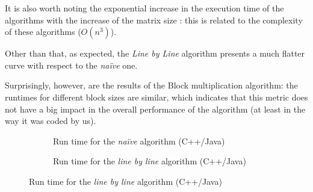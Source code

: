 \documentclass[11pt,a4paper]{article}
\begin{document}
It is also worth noting  the exponential increase in the execution time of the algorithms with the increase of the matrix size : this is related to the complexity of these algorithms ($O(n^3)$).

Other than that, as expected, the \emph{Line by Line} algorithm presents a much flatter curve with respect to the \emph{naïve} one.

Surprisingly, however, are the results of the Block multiplication algorithm: the runtimes for different block sizes are similar, which indicates that this metric does not have a big impact in the overall performance of the algorithm (at least in the way it was coded by us).

\begin{figure}[H]
    \centering
    \begin{subfigure}{0.48\textwidth}
        \centering
        \caption{Run time for the \emph{naïve} algorithm (C++/Java)}
    \end{subfigure}
    \hfill%
    \begin{subfigure}{0.48\textwidth}
        \centering
        \caption{Run time for the \emph{line by line} algorithm (C++/Java)}
    \end{subfigure}
\end{figure}
\end{document}
